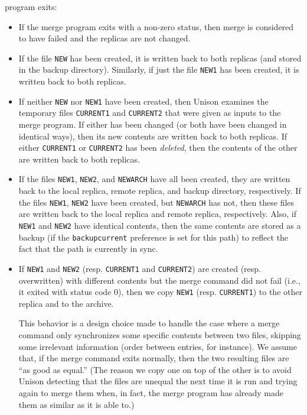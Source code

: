 \documentclass{article}
\begin{document}
program exits:
\begin{itemize}
\item If the merge program exits with a non-zero status, then merge is
  considered to have failed and the replicas are not changed.
\item If the file \verb|NEW| has been created, it is written back to both
  replicas (and stored in the backup directory).  Similarly, if just the
  file \verb|NEW1| has been created, it is written back to both 
  replicas.
\item If neither \verb|NEW| nor \verb|NEW1| have been created, then Unison
  examines the temporary files \verb|CURRENT1|  and \verb|CURRENT2| that
  were given as inputs to the merge program.  If either has been changed (or
  both have been changed in identical ways), then its new contents are written
  back to both replicas.  If either \verb|CURRENT1| or \verb|CURRENT2| has
  been {\em deleted}, then the contents of the other are written back to
  both replicas.
\item If the files \verb|NEW1|, \verb|NEW2|, and \verb|NEWARCH| have all
  been created, they are written back to the local replica, remote replica,
  and backup directory, respectively. If the files \verb|NEW1|, \verb|NEW2| have 
  been created, but \verb|NEWARCH| has not, then these files are written back to the
  local replica and remote replica, respectively.  Also, if \verb|NEW1| and
  \verb|NEW2| have identical contents, then the same contents are stored as
  a backup (if the \verb|backupcurrent| preference is set for this path) to
  reflect the fact that the path is currently in sync. 
  \item If \verb|NEW1| and \verb|NEW2| (resp. \verb|CURRENT1| and
  \verb|CURRENT2|) are created (resp. overwritten) with different contents
  but the merge command did not fail (i.e., it exited with status code 0),
  then we copy \verb|NEW1| (resp. \verb|CURRENT1|) to the other replica and
  to the archive.  
  
  This behavior is a design choice made to handle the case where a merge
  command only synchronizes some specific contents between two files,
  skipping some irrelevant information (order between entries, for
  instance).  We assume that, if the merge command exits normally, then the
  two resulting files are ``as good as equal.'' (The reason we copy one on
  top of the other is to avoid Unison detecting that the files are unequal
  the next time it is run and trying again to merge them when, in fact, the
  merge program has already made them as similar as it is able to.)
\end{itemize}
\end{document}
